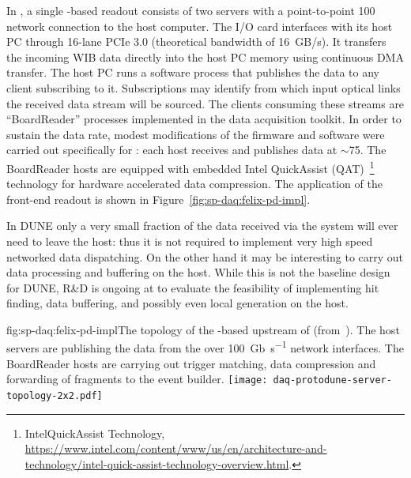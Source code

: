 In , a single  -based readout consists of two servers with a point-to-point \SI{100}{\Gbps} network connection to the  host computer.
The  I/O card interfaces with its host PC through 16-lane PCIe 3.0 (theoretical bandwidth of \SI{16}{GB/s}).
It transfers the incoming WIB data directly into the host PC memory using continuous DMA transfer. The  host PC runs a software process that publishes the data to any client subscribing to it.
Subscriptions may identify from which input optical links the received data stream will be sourced.
The clients consuming these streams are ``BoardReader'' processes implemented in the  data acquisition toolkit.
In order to sustain the data rate, modest modifications of the firmware and software were carried out specifically for : each  host receives and publishes data at $\sim$\SI{75}{\Gbps}. The BoardReader hosts are equipped with embedded Intel QuickAssist (QAT)~\footnote{Intel\textregistered QuickAssist Technology, \url{https://www.intel.com/content/www/us/en/architecture-and-technology/intel-quick-assist-technology-overview.html}.} technology for hardware accelerated data compression. The  application of the  front-end readout is shown in Figure~\ref{fig:sp-daq:felix-pd-impl}.


In DUNE only a very small fraction of the data received via the 
system will ever need to leave the host: thus it is not required to
implement very high speed networked data dispatching. On the other
hand it may be interesting to carry out data processing and buffering
on the host. While this is not the baseline design for DUNE, R\&D is
ongoing at  to evaluate the feasibility of
implementing hit finding, data buffering, and possibly even local
 generation on the  host. 


\begin{dunefigure}{fig:sp-daq:felix-pd-impl}{The topology of the -based
    upstream  of  (from~\cite{pdsp-felix}). The  host servers are publishing the data from the  over \SI{100}{Gb\per\second} network interfaces. The BoardReader hosts are carrying out trigger matching, data compression and forwarding of fragments to the event builder.}
 \texttt{[image: daq-protodune-server-topology-2x2.pdf]}
\end{dunefigure}

